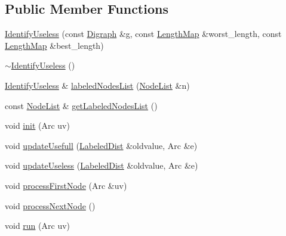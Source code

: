 \subsection*{Public Member Functions}
\begin{DoxyCompactItemize}
\item 
\hyperlink{classlemon_1_1_identify_useless_a6bf14db861b7ed6ad63c75a0f7ff399b}{Identify\+Useless} (const \hyperlink{classlemon_1_1_identify_useless_a68c5b16f64c42ef8d89c3d4c467aad06}{Digraph} \&g, const \hyperlink{classlemon_1_1_identify_useless_a47fb50fbfa981adae466fc6e71436fee}{Length\+Map} \&worst\+\_\+length, const \hyperlink{classlemon_1_1_identify_useless_a47fb50fbfa981adae466fc6e71436fee}{Length\+Map} \&best\+\_\+length)
\item 
\hyperlink{classlemon_1_1_identify_useless_ae172f96d5b16abb8cb808e1dcb883d6c}{$\sim$\+Identify\+Useless} ()
\item 
\hyperlink{classlemon_1_1_identify_useless}{Identify\+Useless} \& \hyperlink{classlemon_1_1_identify_useless_a3986528d341d1b86fb81ac2545977101}{labeled\+Nodes\+List} (\hyperlink{classlemon_1_1_identify_useless_a9de719ca7cb13d499ff99c728d4ec16e}{Node\+List} \&n)
\item 
const \hyperlink{classlemon_1_1_identify_useless_a9de719ca7cb13d499ff99c728d4ec16e}{Node\+List} \& \hyperlink{classlemon_1_1_identify_useless_a2e8edf47e8d037ec5c2c6e5aa9fac5a2}{get\+Labeled\+Nodes\+List} ()
\item 
void \hyperlink{classlemon_1_1_identify_useless_a82c7b862cee2c0b46f48587f8af40a41}{init} (Arc uv)
\item 
void \hyperlink{classlemon_1_1_identify_useless_a20aba1b1f5f33c63804b5d4803c29c4f}{update\+Usefull} (\hyperlink{classlemon_1_1_identify_useless_ad44b00c430e4b58280c0399b4a02de4d}{Labeled\+Dist} \&oldvalue, Arc \&e)
\item 
void \hyperlink{classlemon_1_1_identify_useless_a380457839c6c0fae6f627a49671ed683}{update\+Useless} (\hyperlink{classlemon_1_1_identify_useless_ad44b00c430e4b58280c0399b4a02de4d}{Labeled\+Dist} \&oldvalue, Arc \&e)
\item 
void \hyperlink{classlemon_1_1_identify_useless_abb11e995306aa60344184e068b88468f}{process\+First\+Node} (Arc \&uv)
\item 
void \hyperlink{classlemon_1_1_identify_useless_ac85abcff75b0d1cb745e3972b35d7ec6}{process\+Next\+Node} ()
\item 
void \hyperlink{classlemon_1_1_identify_useless_aee17692788038ba6058f5dc4b74ae3af}{run} (Arc uv)
\end{DoxyCompactItemize}


